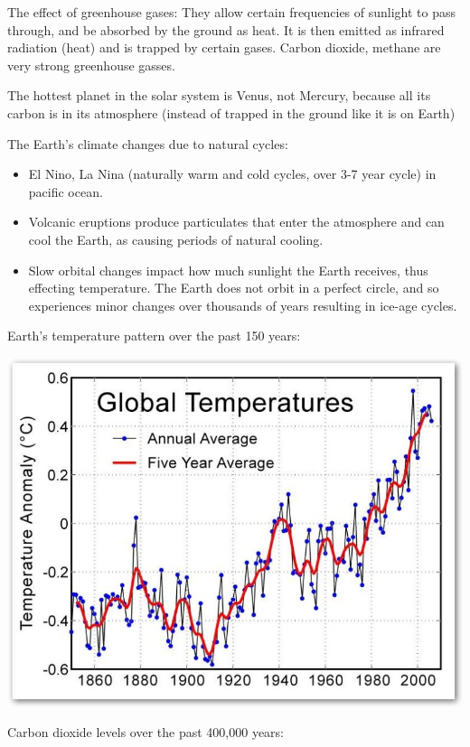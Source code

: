 \documentclass[12pt]{article}
\begin{document}
The effect of greenhouse gases: They allow certain frequencies of sunlight to pass through, and be absorbed by the ground as heat. It is then emitted as infrared radiation (heat) and is trapped by certain gases. Carbon dioxide, methane are very strong greenhouse gasses.

The hottest planet in the solar system is Venus, not Mercury, because all its carbon is in its atmosphere (instead of trapped in the ground like it is on Earth)

The Earth's climate changes due to natural cycles:
\begin{itemize}
	\item El Nino, La Nina (naturally warm and cold cycles, over 3-7 year cycle) in pacific ocean.
	\item  Volcanic eruptions produce particulates that enter the atmosphere and can cool the Earth, as causing periods of natural cooling.
	\item Slow orbital changes impact how much sunlight the Earth receives, thus effecting temperature. The Earth does not orbit in a perfect circle, and so experiences minor changes over thousands of years resulting in ice-age cycles.
\end{itemize}

\clearpage
Earth's temperature pattern over the past 150 years:

\includegraphics[width=6in]{../images/global_temperature.jpg}

Carbon dioxide levels over the past 400,000 years:
\end{document}
